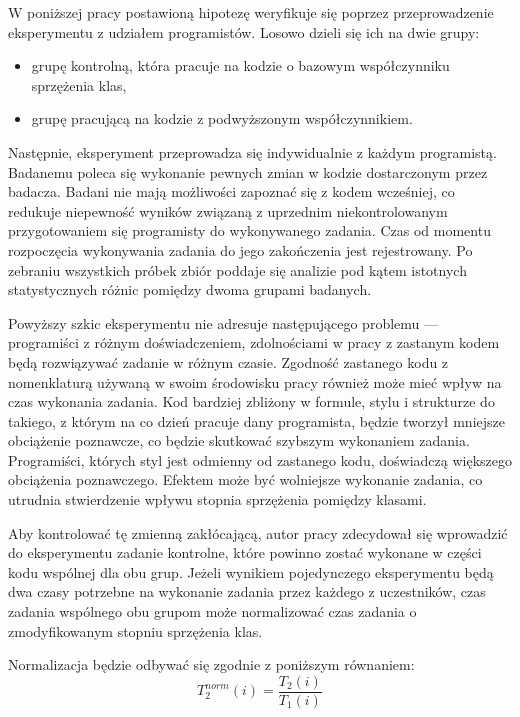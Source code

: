 W poniższej pracy postawioną hipotezę weryfikuje się poprzez przeprowadzenie eksperymentu z udziałem
programistów.
Losowo dzieli się ich na dwie grupy:
\begin{itemize}
    \item grupę kontrolną, która pracuje na kodzie o bazowym współczynniku sprzężenia klas,
    \item grupę pracującą na kodzie z podwyższonym współczynnikiem.
\end{itemize}
Następnie, eksperyment przeprowadza się indywidualnie z każdym programistą.
Badanemu poleca się wykonanie pewnych zmian w kodzie dostarczonym przez badacza.
Badani nie mają możliwości zapoznać się z kodem wcześniej, co redukuje niepewność wyników związaną z uprzednim
niekontrolowanym przygotowaniem się programisty do wykonywanego zadania.
Czas od momentu rozpoczęcia wykonywania zadania do jego zakończenia jest rejestrowany.
Po zebraniu wszystkich próbek zbiór poddaje się analizie pod kątem istotnych statystycznych różnic pomiędzy
dwoma grupami badanych.

Powyższy szkic eksperymentu nie adresuje następującego problemu --- programiści z różnym doświadczeniem, zdolnościami w
pracy z zastanym kodem będą rozwiązywać zadanie w różnym czasie.
Zgodność zastanego kodu z nomenklaturą używaną w swoim środowisku pracy również może mieć wpływ na czas wykonania
zadania.
Kod bardziej zbliżony w formule, stylu i strukturze do takiego, z którym na co dzień pracuje dany programista, będzie
tworzył mniejsze obciążenie poznawcze, co będzie skutkować szybszym wykonaniem zadania.
Programiści, których styl jest odmienny od zastanego kodu, doświadczą większego obciążenia poznawczego.
Efektem może być wolniejsze wykonanie zadania, co utrudnia stwierdzenie wpływu stopnia sprzężenia pomiędzy klasami.

Aby kontrolować tę zmienną zakłócającą, autor pracy zdecydował się wprowadzić do eksperymentu zadanie kontrolne, które
powinno zostać wykonane w części kodu wspólnej dla obu grup.
Jeżeli wynikiem pojedynczego eksperymentu będą dwa czasy potrzebne na wykonanie zadania przez każdego z uczestników,
czas zadania wspólnego obu grupom może normalizować czas zadania o zmodyfikowanym stopniu sprzężenia klas.

Normalizacja będzie odbywać się zgodnie z poniższym równaniem:
\nopagebreak[4]
\begin{equation}
    T_2^{norm}(i) = \frac{T_2(i)}{T_1(i)}
    \label{eq:normalization}
\end{equation}

